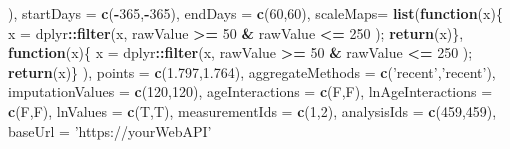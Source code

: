 \documentclass[
]{article}
\newenvironment{Shaded}{\begin{snugshade}}{\end{snugshade}}
\newcommand{\ControlFlowTok}[1]{\textcolor[rgb]{0.13,0.29,0.53}{\textbf{#1}}}
\newcommand{\DataTypeTok}[1]{\textcolor[rgb]{0.13,0.29,0.53}{#1}}
\newcommand{\DecValTok}[1]{\textcolor[rgb]{0.00,0.00,0.81}{#1}}
\newcommand{\FloatTok}[1]{\textcolor[rgb]{0.00,0.00,0.81}{#1}}
\newcommand{\KeywordTok}[1]{\textcolor[rgb]{0.13,0.29,0.53}{\textbf{#1}}}
\newcommand{\NormalTok}[1]{#1}
\newcommand{\OperatorTok}[1]{\textcolor[rgb]{0.81,0.36,0.00}{\textbf{#1}}}
\newcommand{\StringTok}[1]{\textcolor[rgb]{0.31,0.60,0.02}{#1}}
\begin{document}
\begin{Shaded}
\begin{Highlighting}[]
{{{{\NormalTok{                                                                ),}
                                                                \DataTypeTok{startDays =} \KeywordTok{c}\NormalTok{(}\OperatorTok{-}\DecValTok{365}\NormalTok{,}\OperatorTok{-}\DecValTok{365}\NormalTok{),}
                                                                \DataTypeTok{endDays =} \KeywordTok{c}\NormalTok{(}\DecValTok{60}\NormalTok{,}\DecValTok{60}\NormalTok{),}
                                                                \DataTypeTok{scaleMaps=} \KeywordTok{list}\NormalTok{(}\ControlFlowTok{function}\NormalTok{(x)\{ x =}\StringTok{ }\NormalTok{dplyr}\OperatorTok{::}\KeywordTok{filter}\NormalTok{(x, rawValue }\OperatorTok{>=}\StringTok{ }\DecValTok{50} \OperatorTok{&}\StringTok{ }\NormalTok{rawValue }\OperatorTok{<=}\StringTok{ }\DecValTok{250}\NormalTok{ ); }\KeywordTok{return}\NormalTok{(x)\},}
                                                                                \ControlFlowTok{function}\NormalTok{(x)\{ x =}\StringTok{ }\NormalTok{dplyr}\OperatorTok{::}\KeywordTok{filter}\NormalTok{(x, rawValue }\OperatorTok{>=}\StringTok{ }\DecValTok{50} \OperatorTok{&}\StringTok{ }\NormalTok{rawValue }\OperatorTok{<=}\StringTok{ }\DecValTok{250}\NormalTok{ ); }\KeywordTok{return}\NormalTok{(x)\}}
\NormalTok{                                                                ),}
                                                                \DataTypeTok{points =} \KeywordTok{c}\NormalTok{(}\FloatTok{1.797}\NormalTok{,}\FloatTok{1.764}\NormalTok{),}
                                                                \DataTypeTok{aggregateMethods =} \KeywordTok{c}\NormalTok{(}\StringTok{'recent'}\NormalTok{,}\StringTok{'recent'}\NormalTok{),}
                                                                \DataTypeTok{imputationValues =} \KeywordTok{c}\NormalTok{(}\DecValTok{120}\NormalTok{,}\DecValTok{120}\NormalTok{),}
                                                                \DataTypeTok{ageInteractions =} \KeywordTok{c}\NormalTok{(F,F),}
                                                                \DataTypeTok{lnAgeInteractions =} \KeywordTok{c}\NormalTok{(F,F),}
                                                                \DataTypeTok{lnValues =} \KeywordTok{c}\NormalTok{(T,T),}
                                                                \DataTypeTok{measurementIds =} \KeywordTok{c}\NormalTok{(}\DecValTok{1}\NormalTok{,}\DecValTok{2}\NormalTok{), }
                                                                \DataTypeTok{analysisIds =} \KeywordTok{c}\NormalTok{(}\DecValTok{459}\NormalTok{,}\DecValTok{459}\NormalTok{),}
                                                                \DataTypeTok{baseUrl =} \StringTok{'https://yourWebAPI'}
                                                                
}}}}
\end{Highlighting}
\end{Shaded}
\end{document}
